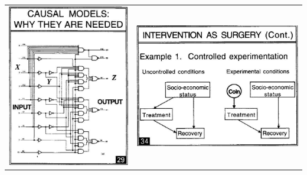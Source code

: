 \documentclass{beamer}
\begin{document}
\begin{frame}
\begin{tabular}{cc}
\includegraphics[scale=0.17]{../images/pearl29.png} &
\includegraphics[scale=0.25]{../images/pearl34.png}
\end{tabular}
\end{frame}
\end{document}
